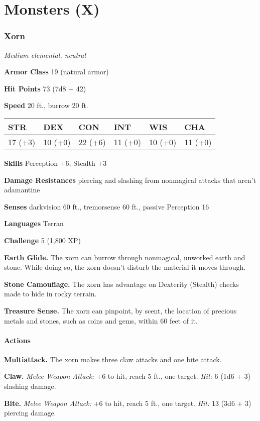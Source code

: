 \documentclass[
]{article}
\date{}
\begin{document}
\hypertarget{monsters-x}{%
\section{Monsters (X)}\label{monsters-x}}

\hypertarget{xorn}{%
\subsubsection{Xorn}\label{xorn}}

\emph{Medium elemental, neutral}

\textbf{Armor Class} 19 (natural armor)

\textbf{Hit Points} 73 (7d8 + 42)

\textbf{Speed} 20 ft., burrow 20 ft.

\begin{longtable}[]{@{}llllll@{}}
\toprule
STR & DEX & CON & INT & WIS & CHA\tabularnewline
\midrule
\endhead
17 (+3) & 10 (+0) & 22 (+6) & 11 (+0) & 10 (+0) & 11 (+0)\tabularnewline
\bottomrule
\end{longtable}

\textbf{Skills} Perception +6, Stealth +3

\textbf{Damage Resistances} piercing and slashing from nonmagical
attacks that aren't adamantine

\textbf{Senses} darkvision 60 ft., tremorsense 60 ft., passive
Perception 16

\textbf{Languages} Terran

\textbf{Challenge} 5 (1,800 XP)

\textbf{Earth Glide.} The xorn can burrow through nonmagical, unworked
earth and stone. While doing so, the xorn doesn't disturb the material
it moves through.

\textbf{Stone Camouflage.} The xorn has advantage on Dexterity (Stealth)
checks made to hide in rocky terrain.

\textbf{Treasure Sense.} The xorn can pinpoint, by scent, the location
of precious metals and stones, such as coins and gems, within 60 feet of
it.

\hypertarget{actions}{%
\paragraph{Actions}\label{actions}}

\textbf{Multiattack.} The xorn makes three claw attacks and one bite
attack.

\textbf{Claw.} \emph{Melee Weapon Attack:} +6 to hit, reach 5 ft., one
target. \emph{Hit:} 6 (1d6 + 3) slashing damage.

\textbf{Bite.} \emph{Melee Weapon Attack:} +6 to hit, reach 5 ft., one
target. \emph{Hit:} 13 (3d6 + 3) piercing damage.
\end{document}
